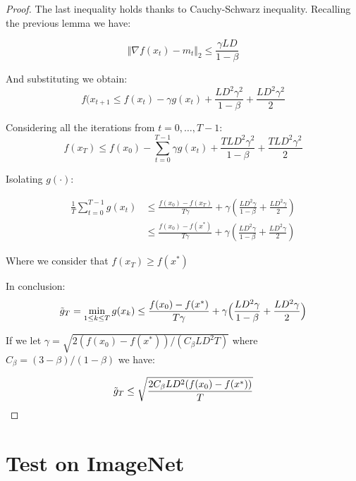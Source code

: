 \documentclass[10pt,twocolumn,letterpaper, english]{article}
\theoremstyle{definition}
\theoremstyle{plain}
\theoremstyle{plain}
\theoremstyle{plain}
\theoremstyle{plain}
\theoremstyle{remark}
\theoremstyle{remark}
\theoremstyle{definition}
\theoremstyle{definition}
\theoremstyle{definition}
\theoremstyle{definition}
\begin{document}
\begin{proof}
The last inequality holds thanks to Cauchy-Schwarz inequality. Recalling the previous lemma we have:

\begin{equation*}
    \Vert \nabla f(x_t) - m_t \Vert_{2} \le \frac{\gamma LD}{ 1 - \beta}
\end{equation*}

And substituting we obtain:
\begin{equation*}
    f(x_{t+1} \le f(x_t) - \gamma g(x_t) + \frac{L D^2 \gamma^2}{1 - \beta} + \frac{L D^2 \gamma^2}{2}
\end{equation*}

Considering all the iterations from $t=0, \dots, T-1$:
\begin{equation*}
    f(x_{T}) \le f(x_0) - \sum_{t=0}^{T-1} \gamma g(x_t) + \frac{T L D^2 \gamma^2}{1 - \beta} + \frac{T L D^2 \gamma^2}{2}
\end{equation*}

Isolating $g(\cdot)$:

\begin{align*}
    \frac{1}{T}\sum_{t=0}^{T-1} g(x_t) & \le \frac{f(x_0)-f(x_T)}{T\gamma} + \gamma(\frac{ L D^2 \gamma}{1 - \beta} + \frac{ L D^2 \gamma}{2})\\
    & \le \frac{f(x_0)-f(x^\ast)}{T\gamma} + \gamma(\frac{ L D^2 \gamma}{1 - \beta} + \frac{ L D^2 \gamma}{2})
\end{align*}

Where we consider that $f(x_T) \ge f(x^\ast)$

In conclusion:
\begin{equation*}
    \Tilde{g}_T= \min_{1 \le k \le T}g(x_k) \le \frac{f(x_0)-f(x^\ast)}{T\gamma} + \gamma \Big(\frac{ L D^2 \gamma}{1 - \beta} + \frac{ L D^2 \gamma}{2} \Big)
\end{equation*}

If we let $ \gamma= \sqrt{2(f(x_0)- f(x^\ast))/(C_\beta L D^2 T )}$ where $C_{\beta}=(3-\beta)/(1-\beta)$ we have:

\begin{equation*}
    \Tilde{g}_T \le \sqrt{ \frac{2C_\beta L D^2 (f(x_0)- f(x^\ast))}{T}}
\end{equation*}

\end{proof}



\section{Test on ImageNet}
\end{document}
